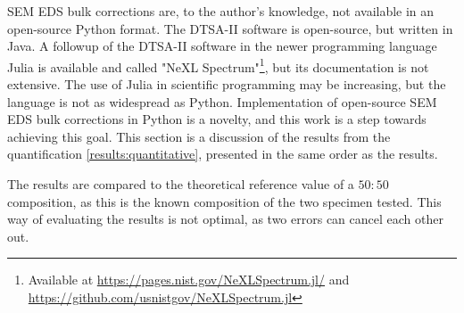 

SEM EDS bulk corrections are, to the author's knowledge, not available in an open-source Python format.
The DTSA-II software is open-source, but written in Java.
A followup of the DTSA-II software in the newer programming language Julia is available and called "NeXL Spectrum"\footnote{Available at \url{https://pages.nist.gov/NeXLSpectrum.jl/} and \url{https://github.com/usnistgov/NeXLSpectrum.jl}}, but its documentation is not extensive.
The use of Julia in scientific programming may be increasing, but the language is not as widespread as Python.
Implementation of open-source SEM EDS bulk corrections in Python is a novelty, and this work is a step towards achieving this goal.
This section is a discussion of the results from the quantification \cref{results:quantitative}, presented in the same order as the results.



The results are compared to the theoretical reference value of a $50:50$ composition, as this is the known composition of the two specimen tested.
This way of evaluating the results is not optimal, as two errors can cancel each other out.











